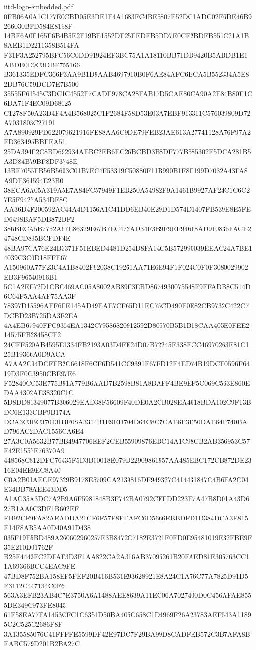 \begin{filecontents*}[overwrite]{iitd-logo-embedded.pdf}
0FB06A0A1C177E0CBD05E3DE1F4A1683FC4BE5807E52DC1ADC02F6DE46B9266030BFD584E8198F
14BF6A0F165F6B4B5E2F19BE1552DF25FEDFB5DD7E0CF2BDFB551C21A1B8AEB1D2211358B514FA
F31F3A252795BFC56C0DD91924EF3BC75A1A18110BB71DB9420B5ABDB1E1ABDE0D9C3DBF755166
B361335EDFC366F3AA9B1D9AAB4697910B0F6AE84AFC6BCA5B552334A5E82DB76C59DCD7E7B500
35555F61545C3DC1C4552F7CADF978CA28FAB17D5CAE80CA90A2E84B80F1C6DA71F4EC09D68025
C1278F50A23D4F4A4B568025C1F2684F58D53E03A7EBF913311C576039809D72A7031803C27191
A7A890929FD622079621916FE88AA6C9DE79FEB23AE613A27741128A76F97A2FD363495BBFEA51
25DA394F2C8BD692934AEBC2EB6EC26BCBD3B8DF777B585302F5DCA281B5A3D84B79BF8DF3748E
13BE7055FB56B5603C01B7EC4F53319C50880F11B990B1F8F199D7032A43FA8A9DE361594E23B0
38ECA6A05A319A5E7A84FC57949F1EB250A54982F9A1461B9927AF24C1C6C27E5F9427A534DF8C
AA36D4F200592AC44A4D1156A1C41DD6EB40E29D1D574D1407FB539E8E5FED6498BAF5DB872DF2
386BECA5B7752A67E86329E67B7EC472AD34F3B9F9EF94618AD910836FACE24748CD895BCFDF4E
48BA97CA76E24B3371F51EBED4481D254D8FA14C5B572990039EEAC24A7BE14039C3C0D18FFE67
A150960A77F23C4A1B8402F92038C19261AA71E6E94F1F024C0F0F3080029902EB3F96540916B1
5C1A2EE72D1CBC469AC05A8002AB89F3EBD8674930075548F9FFADB8C514D6C64F5AA4AF75AA3F
78397D15596AFF6FE145AD49EAE7CF65D11EC75CD490F0E82CB9732C422C7DCBD23B725DA3E2EA
4A4EB67940FFC9364EA1342C79586820912592D80570B5B1B18CAA405E0FEE214575FB28458CF2
24CFF520AB4595E1334FB2193A03D4FE24D07B72245F338ECC46970263E81C125B19366A0D9ACA
A7AA2C94DCFFB2C6618F6CF6D541CC9391F67FD12E4ED74B19DCE0596F6419D3F0C3950CBE97E6
F52840CC53E775B91A779B6AAD7B2598B81A8BAFF4BE9EF5C069C563E860EDAA4302AE38320C1C
5D8DD81349077B306029EAD38F56609F40DE0A2CB028EA4618BDA102C9F13BDC6E133CBF9B174A
DCA3C3BC37043B3F08A3314B1E9ED704D64C8C7CAE6F3E50DAE64F740BAD796AC2DAC1556CA6E4
27A3C0A5632B77BB4947706EEF2CEB55909876EBC14A1C98CB2AB356953C57F42E1557E76370A9
448568C812DFC76435F5D3B00018E079D22909861957AA485EBC172CB872DE2316E04EE9EC8A40
C0A2B01AECE97329B9178E5709CA2139816DF949327C414431847C4B6FA2C04E34BB78AEE43DD5
A1AC35A3DC7A2B9A6F5981848B3F742BA0792CFFDD223E7A47B8D01A43D627B1AA0C3DF1B602EF
EB92CF9FA82AEADDA21CE6F57F8FDAFC6D5666EBBDFD1D384DCA3E815E14F8AB5AA0D40A91D438
035F19E5BD489A260602960257E3B8472C7182E3721F0FD0E95481019E32FBE9F35E210D01762F
B25F4443FC2DFAF3D3F1AA822CA2A316AB37095261B20FAED81E305763CC11A69366BCC4EAC9FE
47BD8F752BA158EF5FEF20B416B531E93628921E8A24C1A76C77A7825D91D5E3112C447134C0F6
563A3EFB23AB4C7E3750A6A1488AEE8639A11EC06A7027400D0C456AFAE8555DE349C973FE8045
61F58EA77FA1453CFC1C6351D50BA405C658C1D4969F26A23783AEF543A11895C2C525C2686F8F
3A135585076C41FFFFE5599DF42E97DC7F29BA99D8CADFEB572C3B7AFA8BEABC579D201B2BA27C

\end{filecontents*}
